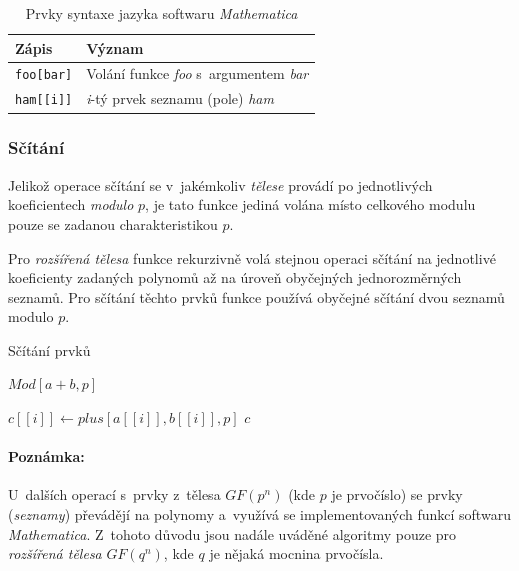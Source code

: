 \documentclass[thesis=M,czech,hidelinks]{FITthesis}[2012/06/26]
\newcommand{\0}{{\textcolor[gray]{0.75}{0}}}
\newenvironment{algoritmus}{
    \floatname{algorithm}{Algoritmus}
    \begin{algorithm}
}{\end{algorithm}}
\begin{document}
\begin{table}[!ht]
    \centering
    \begin{tabular}{l  l}
        Zápis               & Význam                                            \\
        \hline
        \texttt{foo[bar]}   & Volání funkce \emph{foo} s~argumentem \emph{bar}  \\
        \texttt{ham[[i]]}   & \emph{i}-tý prvek seznamu (pole) \emph{ham}       \\
    \end{tabular}
    \caption{Prvky syntaxe jazyka softwaru \emph{Mathematica}}
\end{table}


\subsubsection{Sčítání}

Jelikož operace sčítání se v~jakémkoliv \emph{tělese} provádí po jednotlivých
koeficientech \emph{modulo} $p$, je tato funkce jediná volána místo celkového
modulu pouze se zadanou charakteristikou $p$.

Pro \emph{rozšířená tělesa} funkce rekurzivně volá stejnou operaci sčítání na
jednotlivé koeficienty zadaných polynomů až na úroveň obyčejných jednorozměrných
seznamů. Pro sčítání těchto prvků funkce používá obyčejné sčítání dvou seznamů
modulo $p$.

\begin{algoritmus}[!ht]
    \caption{Sčítání prvků}
    \begin{algorithmic}[1]
        \State \Return $Mod[a+b,p]$
     \EndFunction
    \end{algorithmic}
    \begin{algorithmic}[1]
            \State $c[[i]] \gets plus[a[[i]],b[[i]],p]$
        \EndFor
        \State \Return $c$
     \EndFunction
    \end{algorithmic}
\end{algoritmus}

\paragraph{Poznámka:} U~dalších operací s~prvky z~tělesa $GF(p^n)$ (kde $p$ je
prvočíslo) se prvky (\emph{seznamy}) převádějí na polynomy a~využívá se
implementovaných funkcí softwaru \emph{Mathematica}. Z~tohoto důvodu jsou nadále
uváděné algoritmy pouze pro \emph{rozšířená tělesa} $GF(q^n)$, kde $q$ je nějaká
mocnina prvočísla.
\end{document}
